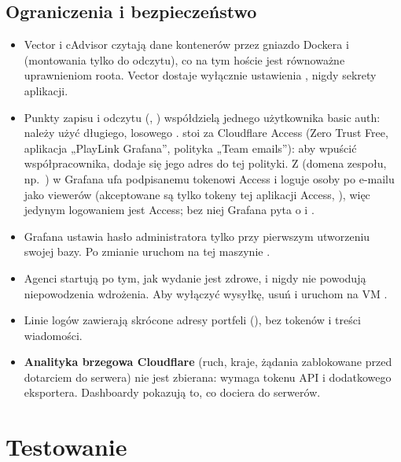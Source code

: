 \section{Ograniczenia i bezpieczeństwo}

\begin{itemize}
  \item Vector i cAdvisor czytają dane kontenerów przez gniazdo Dockera i  (montowania tylko do odczytu), co na tym hoście jest równoważne uprawnieniom roota. Vector dostaje wyłącznie ustawienia , nigdy sekrety aplikacji.
  \item Punkty zapisu i odczytu (, ) współdzielą jednego użytkownika basic auth: należy użyć długiego, losowego .  stoi za Cloudflare Access (Zero Trust Free, aplikacja „PlayLink Grafana'', polityka „Team emails''): aby wpuścić współpracownika, dodaje się jego adres do tej polityki. Z  (domena zespołu, np.\ ) w  Grafana ufa podpisanemu tokenowi Access i loguje osoby po e-mailu jako viewerów (akceptowane są tylko tokeny tej aplikacji Access, ), więc jedynym logowaniem jest Access; bez niej Grafana pyta o  i .
  \item Grafana ustawia hasło administratora tylko przy pierwszym utworzeniu swojej bazy. Po zmianie  uruchom na tej maszynie .
  \item Agenci startują po tym, jak wydanie jest zdrowe, i nigdy nie powodują niepowodzenia wdrożenia. Aby wyłączyć wysyłkę, usuń  i uruchom na VM .
  \item Linie logów zawierają skrócone adresy portfeli (), bez tokenów i treści wiadomości.
  \item \textbf{Analityka brzegowa Cloudflare} (ruch, kraje, żądania zablokowane przed dotarciem do serwera) nie jest zbierana: wymaga tokenu API i dodatkowego eksportera. Dashboardy pokazują to, co dociera do serwerów.
\end{itemize}

\chapter{Testowanie}
\label{ch:op-testowanie}


